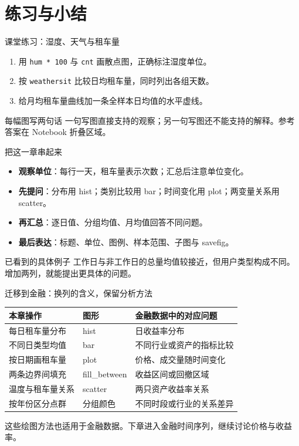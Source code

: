 \documentclass[9pt]{ctexbeamer}
\begin{document}
\section{练习与小结}

\begin{frame}{课堂练习：湿度、天气与租车量}
\begin{enumerate}
\item 用 \texttt{hum * 100} 与 \texttt{cnt} 画散点图，正确标注湿度单位。
\item 按 \texttt{weathersit} 比较日均租车量，同时列出各组天数。
\item 给月均租车量曲线加一条全样本日均值的水平虚线。
\end{enumerate}
\begin{block}{每幅图写两句话}
一句写图直接支持的观察；另一句写图还不能支持的解释。参考答案在 Notebook 折叠区域。
\end{block}
\end{frame}

\begin{frame}{把这一章串起来}
\begin{itemize}
\item \textbf{观察单位}：每行一天，租车量表示次数；汇总后注意单位变化。
\item \textbf{先提问}：分布用 hist；类别比较用 bar；时间变化用 plot；两变量关系用 scatter。
\item \textbf{再汇总}：逐日值、分组均值、月均值回答不同问题。
\item \textbf{最后表达}：标题、单位、图例、样本范围、子图与 savefig。
\end{itemize}
\begin{block}{已看到的具体例子}
工作日与非工作日的总量均值较接近，但用户类型构成不同。增加两列，就能提出更具体的问题。
\end{block}
\end{frame}

\begin{frame}{迁移到金融：换列的含义，保留分析方法}
\small
\begin{tabular}{lll}
\toprule
本章操作 & 图形 & 金融数据中的对应问题 \\
\midrule
每日租车量分布 & hist & 日收益率分布 \\
不同日类型均值 & bar & 不同行业或资产的指标比较 \\
按日期画租车量 & plot & 价格、成交量随时间变化 \\
两条边界间填充 & fill\_between & 收益区间或回撤区域 \\
温度与租车量关系 & scatter & 两只资产收益率关系 \\
按年份区分点群 & 分组颜色 & 不同时段或行业的关系差异 \\
\bottomrule
\end{tabular}
\par\medskip 这些绘图方法也适用于金融数据。下章进入金融时间序列，继续讨论价格与收益率。
\end{frame}
\end{document}

